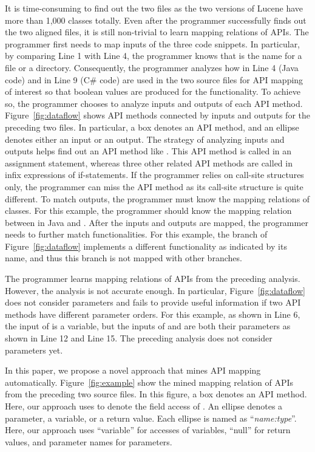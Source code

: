 It is time-consuming to find out the two files as the two versions
of Lucene have more than 1,000 classes totally. Even after the
programmer successfully finds out the two aligned files, it is still
non-trivial to learn mapping relations of APIs. The programmer first
needs to map inputs of the three code snippets. In particular, by
comparing Line 1 with Line 4, the programmer knows that
 is the name for a file or a directory. Consequently,
the programmer analyzes how  in Line 4 (Java code) and
 in Line 9 (C\# code) are used in the two source files
for API mapping of interest so that boolean values are produced for
the functionality. To achieve so, the programmer chooses to analyze
inputs and outputs of each API method. Figure~\ref{fig:dataflow}
shows API methods connected by inputs and outputs for the preceding
two files. In particular, a box denotes an API method, and an
ellipse denotes either an input or an output. The strategy of
analyzing inputs and outputs helps find out an API method like
. This API method is called in
an assignment statement, whereas three other related API methods are
called in infix expressions of if-statements. If the programmer
relies on call-site structures only, the programmer can miss the API
method as its call-site structure is quite different. To match
outputs, the programmer must know the mapping relations of classes.
For this example, the programmer should know the mapping relation
between  in Java and . After
the inputs and outputs are mapped, the programmer needs to further
match functionalities. For this example, the 
branch of Figure~\ref{fig:dataflow} implements a different
functionality as indicated by its name, and thus this branch is not
mapped with other branches.

The programmer learns mapping relations of APIs from the preceding
analysis. However, the analysis is not accurate enough. In
particular, Figure~\ref{fig:dataflow} does not consider parameters
and fails to provide useful information if two API methods have
different parameter orders. For this example, as shown in Line 6,
the input of  is a variable, but the
inputs of  and
 are both their parameters as shown
in Line 12 and Line 15. The preceding analysis does not consider
parameters yet.

In this paper, we propose a novel approach that mines API mapping
automatically. Figure~\ref{fig:example} show the mined mapping
relation of APIs from the preceding two source files. In this
figure, a box denotes an API method. Here, our approach uses
 to denote the field access of
. An ellipse denotes a parameter, a variable, or a
return value. Each ellipse is named as ``\emph{name:type}''. Here,
our approach uses ``variable'' for accesses of variables, ``null''
for return values, and parameter names for parameters.


